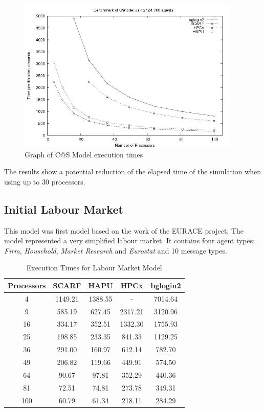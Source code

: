 \begin{figure}[ht]
 \centering
  \includegraphics[width=300pt]{C@S2-graph.jpg}
 \caption{Graph of C@S Model execution times}
 \label{fig:C@S-graph}
\end{figure}

The results show a potential reduction of the elapsed time of the simulation when using up to 30 processors.



\subsection{Initial Labour Market}

This model was first model based on the work of the EURACE project. The model represented a very simplified labour market. It contains four agent types: \textit{Firm}, \textit{Household}, \textit{Market Research} and \textit{Eurostat} and 10 message types.

{
\renewcommand{\arraystretch}{1.25}
\begin{table}[ht]
 \centering
  \begin{tabular}{c|cccc}
 Processors &SCARF &HAPU  &HPCx   &bglogin2 \\ \hline
4 &1149.21 &1388.55 &- &7014.64 \\
9 &585.19 &627.45 &2317.21 &3120.96     \\
16 &334.17 &352.51 &1332.30 &1755.93    \\
25 &198.85 &233.35 &841.33 &1129.25     \\
36 &291.00 &160.97 &612.14 &782.70      \\
49 &206.82 &119.66 &449.91 &574.50      \\
64 &90.67 &97.81 &352.29 &440.36        \\
81 &72.51 &74.81 &273.78 &349.31        \\
100 &60.79 &61.34 &218.11 &284.29       \\
 \end{tabular}
 \caption{Execution Times for Labour Market Model}
 \label{tab:ExecutionTimesForLabour}
\end{table}
}

